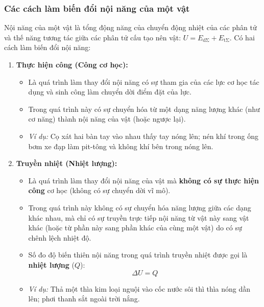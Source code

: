 
\subsubsection{Các cách làm biến đổi nội năng của một vật}

\begin{kienthuc}
	Nội năng của một vật là tổng động năng của chuyển động nhiệt của các phân tử và thế năng tương tác giữa các phân tử cấu tạo nên vật: $U = E_{\mathrm{d\Sigma}} + E_{\mathrm{t\Sigma}}$. Có hai cách làm biến đổi nội năng:
	\begin{enumerate}
		\item \textbf{Thực hiện công (Công cơ học):}
		\begin{itemize}
			\item Là quá trình làm thay đổi nội năng có sự tham gia của các lực cơ học tác dụng và sinh công làm chuyển dời điểm đặt của lực.
			\item Trong quá trình này có sự chuyển hóa từ một dạng năng lượng khác (như cơ năng) thành nội năng của vật (hoặc ngược lại).
			\item \textit{Ví dụ:} Cọ xát hai bàn tay vào nhau thấy tay nóng lên; nén khí trong ống bơm xe đạp làm pit-tông và không khí bên trong nóng lên.
		\end{itemize}
		\item \textbf{Truyền nhiệt (Nhiệt lượng):}
		\begin{itemize}
			\item Là quá trình làm thay đổi nội năng của vật mà \textbf{không có sự thực hiện công} cơ học (không có sự chuyển dời vĩ mô).
			\item Trong quá trình này không có sự chuyển hóa năng lượng giữa các dạng khác nhau, mà chỉ có sự truyền trực tiếp nội năng từ vật này sang vật khác (hoặc từ phần này sang phần khác của cùng một vật) do có sự chênh lệch nhiệt độ.
			\item Số đo độ biến thiên nội năng trong quá trình truyền nhiệt được gọi là \textbf{nhiệt lượng} ($Q$):
			\[
			\Delta U = Q
			\]
			\item \textit{Ví dụ:} Thả một thìa kim loại nguội vào cốc nước sôi thì thìa nóng dần lên; phơi thanh sắt ngoài trời nắng.
		\end{itemize}
	\end{enumerate}
\end{kienthuc}

